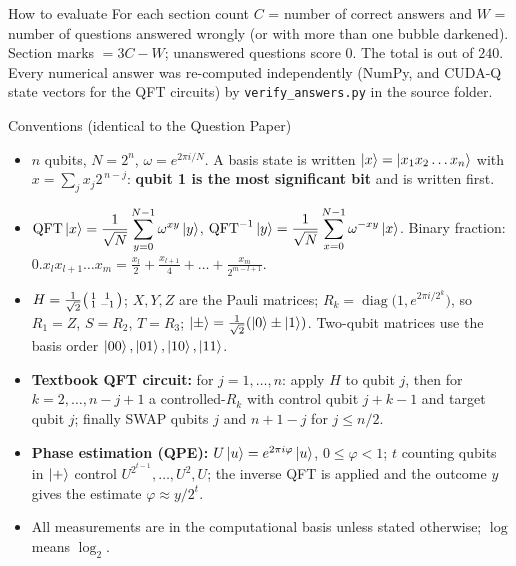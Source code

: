\documentclass[11pt,a4paper]{article}
\begin{document}
\begin{infobox}{How to evaluate}
For each section count $C$ = number of correct answers and $W$ = number of questions answered wrongly (or with more than
one bubble darkened). Section marks $= 3C - W$; unanswered questions score $0$. The total is out of $240$.
Every numerical answer was re-computed independently (NumPy, and CUDA-Q state vectors for the QFT circuits) by
\texttt{verify\_answers.py} in the source folder.
\end{infobox}
\begin{infobox}{Conventions (identical to the Question Paper)}

\begin{itemize}[leftmargin=1.2em, itemsep=1pt, topsep=2pt]
\item $n$ qubits, $N = 2^n$, $\omega = e^{2\pi i/N}$. A basis state is written $\ket{x} = \ket{x_1x_2\dots x_n}$ with
      $x = \sum_{j} x_j 2^{\,n-j}$: \textbf{qubit 1 is the most significant bit} and is written first.
\item $\displaystyle \mathrm{QFT}\ket{x} = \frac{1}{\sqrt N}\sum_{y=0}^{N-1}\omega^{xy}\ket{y}$, \quad
      $\displaystyle \mathrm{QFT}^{-1}\ket{y} = \frac{1}{\sqrt N}\sum_{x=0}^{N-1}\omega^{-xy}\ket{x}$.
      Binary fraction: $0.x_lx_{l+1}\dots x_m = \frac{x_l}{2} + \frac{x_{l+1}}{4} + \dots + \frac{x_m}{2^{m-l+1}}$.
\item $H = \frac{1}{\sqrt2}\begin{psmallmatrix}1&1\\1&-1\end{psmallmatrix}$; $X, Y, Z$ are the Pauli matrices;
      $R_k = \operatorname{diag}\big(1, e^{2\pi i/2^k}\big)$, so $R_1 = Z$, $S = R_2$, $T = R_3$;
      $\ket{\pm} = \frac{1}{\sqrt2}(\ket0 \pm \ket1)$. Two-qubit matrices use the basis order $\ket{00}, \ket{01}, \ket{10}, \ket{11}$.
\item \textbf{Textbook QFT circuit:} for $j = 1, \dots, n$: apply $H$ to qubit $j$, then for $k = 2, \dots, n-j+1$ a controlled-$R_k$
      with control qubit $j+k-1$ and target qubit $j$; finally SWAP qubits $j$ and $n+1-j$ for $j \le n/2$.
\item \textbf{Phase estimation (QPE):} $U\ket{u} = e^{2\pi i\varphi}\ket{u}$, $0 \le \varphi < 1$; $t$ counting qubits in $\ket{+}$ control
      $U^{2^{t-1}}, \dots, U^{2}, U$; the inverse QFT is applied and the outcome $y$ gives the estimate $\varphi \approx y/2^t$.
\item All measurements are in the computational basis unless stated otherwise; $\log$ means $\log_2$.
\end{itemize}
\end{infobox}
\newpage
\end{document}
